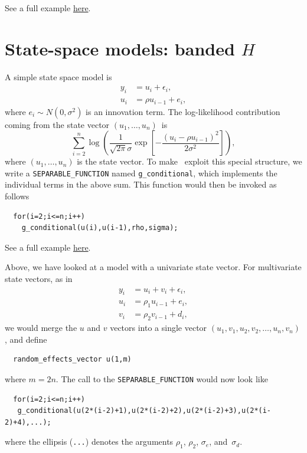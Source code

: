 \documentclass{admbmanual}
\begin{document}
See a full example \href{http://www.otter-rsch.com/admbre/examples/weights/weights.html}{here}.


\section{State-space models: banded $H$}
\label{sec:state-space}

A simple state space model is
\begin{align*}
  y_i &= u_i + \epsilon_i,\\
  u_i &= \rho u_{i-1} + e_i,
\end{align*}
where $e_i\sim N(0,\sigma^2)$ is an innovation term. The log-likelihood contribution
coming from the state vector $(u_1,\ldots,u_n)$~is 
\[
  \sum_{i=2}^n \log\left(\frac{1}{\sqrt{2\pi }\sigma }
                \exp\left[-\frac{(u_{i}-\rho u_{i-1})^{2}}{2\sigma^2}\right]\right),
\]
where $(u_1,\ldots,u_n)$ is the state vector. To make \scAR\ exploit this 
special structure, we write a \texttt{SEPARABLE\_FUNCTION} named
\texttt{g\_conditional}, which implements the individual terms in the above sum.
This function would then be invoked as follows 
\begin{lstlisting}
  for(i=2;i<=n;i++)
    g_conditional(u(i),u(i-1),rho,sigma);
\end{lstlisting}
See a full example \href{http://www.otter-rsch.com/admbre/examples/polio/polio.html}{here}.

Above, we have looked at a model with a univariate state vector. For multivariate
state vectors, as in 
\begin{align*}
  y_i &= u_i + v_i +\epsilon_i,\\
  u_i &= \rho_1 u_{i-1} + e_i,\\
  v_i &= \rho_2 v_{i-1} + d_i,
\end{align*}
we would merge the $u$ and $v$ vectors into a single vector
$(u_1,v_1,u_2,v_2,\ldots,u_n,v_n)$, and define
\begin{lstlisting}
  random_effects_vector u(1,m)
\end{lstlisting}
where $m=2n$. The call to the \texttt{SEPARABLE\_FUNCTION} would now look like
\begin{lstlisting}
  for(i=2;i<=n;i++)
   g_conditional(u(2*(i-2)+1),u(2*(i-2)+2),u(2*(i-2)+3),u(2*(i-2)+4),...);
\end{lstlisting}
where the ellipsis (\texttt{...}) denotes the arguments $\rho_1$, $\rho_2$, $\sigma_e$, and~$\sigma_d$.
\end{document}
